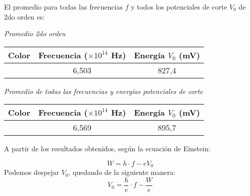 \documentclass[a4paper]{article}
\begin{document}
      \indent El promedio para todas las frecuencias $f$ y todos los potenciales de corte $V_{0}$ de 2do orden es:
      \vspace{5mm}

      \begin{minipage}[c]{7.5cm}
        \vspace{5mm}
        \centering
        \textit{Promedio 2do orden} 
        \vspace{2mm}
      \end{minipage}

      \begin{tabular}{ c c c }
        \toprule
        Color & Frecuencia ($\times 10^{14}$ Hz) & Energía $V_{0}$ (mV) \\
          \midrule
          & 6,503 & 827,4 \\
        \bottomrule
      \end{tabular}
      \vspace{5mm}
      
      \begin{minipage}[c]{7.5cm}
        \vspace{5mm}
        \centering
        \textit{Promedio de todas las frecuencias y energías potenciales de corte} 
        \vspace{2mm}
      \end{minipage}
      
      \begin{tabular}{ c c c }
        \toprule
        Color & Frecuencia ($\times 10^{14}$ Hz) & Energía $V_{0}$ (mV) \\
          \midrule
          & 6,569 & 895,7 \\
        \bottomrule
      \end{tabular}
      \vspace{5mm}

      \indent A partir de los resultados obtenidos, según la ecuación de Einstein:
      
      \begin{equation}
        W = h \cdot f - eV_{0}
      \end{equation}
      \indent Podemos despejar $V_{0}$, quedando de la siguiente manera:
      \begin{equation}
        V_{0} = \frac{h}{e} \cdot f - \frac{W}{e}
      \end{equation}

      \vspace{5mm}
\end{document}
